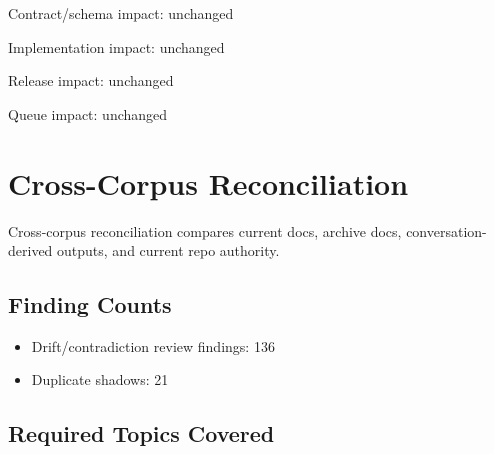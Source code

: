 \documentclass[11pt,a4paper]{report}
\begin{document}
Contract/\allowbreak{}schema impact: unchanged

Implementation impact: unchanged

Release impact: unchanged

Queue impact: unchanged


\chapter{Cross-Corpus Reconciliation}

Cross-\allowbreak{}corpus reconciliation compares current docs, archive docs, conversation-\allowbreak{}derived outputs, and current repo authority.\allowbreak{}


\section{Finding Counts}

\begin{itemize}
\item Drift/\allowbreak{}contradiction review findings: 136
\item Duplicate shadows: 21
\end{itemize}

\section{Required Topics Covered}
\end{document}
